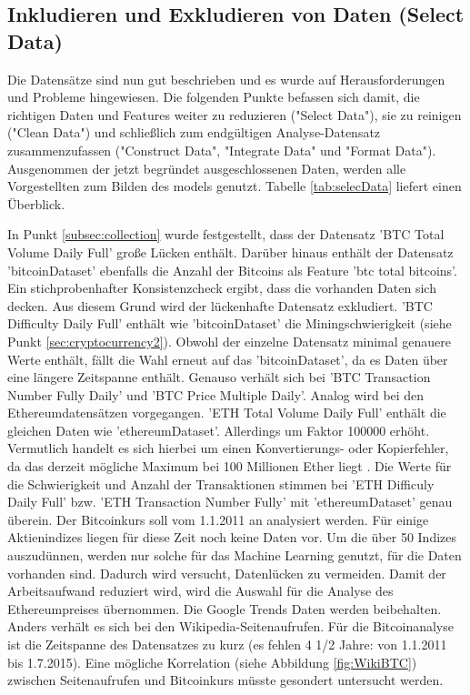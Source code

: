 \subsection{Inkludieren und Exkludieren von Daten (Select Data)}
Die Datensätze sind nun gut beschrieben und es wurde auf Herausforderungen und Probleme hingewiesen. Die folgenden Punkte befassen sich damit, die richtigen Daten und Features weiter zu reduzieren ("Select Data"), sie zu reinigen ("Clean Data") und schließlich zum endgültigen Analyse-Datensatz zusammenzufassen ("Construct Data", "Integrate Data" und "Format Data").
Ausgenommen der jetzt begründet ausgeschlossenen Daten, werden alle Vorgestellten zum Bilden des \gls{model}s genutzt. Tabelle \ref{tab:selecData} liefert einen Überblick.

In Punkt \ref{subsec:collection} wurde festgestellt, dass der Datensatz 'BTC \textunderscore Total \textunderscore Volume \textunderscore Daily \textunderscore Full' große Lücken enthält. Darüber hinaus enthält der Datensatz 'bitcoinDataset' ebenfalls die Anzahl der Bitcoins als Feature 'btc \textunderscore total \textunderscore bitcoins'. Ein stichprobenhafter Konsistenzcheck ergibt, dass die vorhanden Daten sich decken. Aus diesem Grund wird der lückenhafte Datensatz exkludiert. 
'BTC \textunderscore Difficulty \textunderscore Daily \textunderscore Full' enthält wie 'bitcoinDataset' die Miningschwierigkeit (siehe Punkt \ref{sec:cryptocurrency2}). Obwohl der einzelne Datensatz minimal genauere Werte enthält, fällt die Wahl erneut auf das 'bitcoinDataset', da es Daten über eine längere Zeitspanne enthält. Genauso verhält sich bei 'BTC \textunderscore Transaction \textunderscore Number \textunderscore Fully \textunderscore Daily' und 'BTC \textunderscore Price \textunderscore Multiple \textunderscore Daily'. 
Analog wird bei den Ethereumdatensätzen vorgegangen. 'ETH \textunderscore Total \textunderscore Volume \textunderscore Daily \textunderscore Full' enthält die gleichen Daten wie 'ethereumDataset'. Allerdings um Faktor 100000 erhöht. Vermutlich handelt es sich hierbei um einen Konvertierungs- oder Kopierfehler, da das derzeit mögliche Maximum bei 100 Millionen Ether liegt . Die Werte für die Schwierigkeit und Anzahl der Transaktionen stimmen bei 'ETH \textunderscore Difficuly \textunderscore Daily \textunderscore Full' bzw. 'ETH \textunderscore Transaction \textunderscore Number \textunderscore Fully' mit 'ethereumDataset' genau überein. 
Der Bitcoinkurs soll vom 1.1.2011 an analysiert werden. Für einige Aktienindizes liegen für diese Zeit noch keine Daten vor. Um die über 50 Indizes auszudünnen, werden nur solche für das Machine Learning genutzt, für die Daten vorhanden sind. Dadurch wird versucht, Datenlücken zu vermeiden. Damit der Arbeitsaufwand reduziert wird, wird die Auswahl für die Analyse des Ethereumpreises übernommen. Die Google Trends Daten werden beibehalten. Anders verhält es sich bei den Wikipedia-Seitenaufrufen. Für die Bitcoinanalyse ist die Zeitspanne des Datensatzes zu kurz (es fehlen 4 1/2 Jahre: von 1.1.2011 bis 1.7.2015). Eine mögliche Korrelation (siehe Abbildung \ref{fig:WikiBTC}) zwischen Seitenaufrufen und Bitcoinkurs müsste gesondert untersucht werden. 
